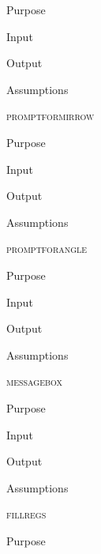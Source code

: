 \documentclass[pdftex, 11pt]{article}
\begin{document}
\begin{description}
		\begin{description}
			\item{Purpose}


			\item{Input}


			\item{Output}


			\item{Assumptions}


		\end{description}


	\item{\textsc{promptformirrow}}

		\begin{description}
			\item{Purpose}


			\item{Input}


			\item{Output}


			\item{Assumptions}


		\end{description}


	\item{\textsc{promptforangle}}

		\begin{description}
			\item{Purpose}


			\item{Input}


			\item{Output}


			\item{Assumptions}


		\end{description}


	\item{\textsc{messagebox}}
		\begin{description}
			\item{Purpose}


			\item{Input}


			\item{Output}


			\item{Assumptions}


		\end{description}



	\item{\textsc{fillregs}}
		\begin{description}
			\item{Purpose}



\end{description}
\end{description}
\end{document}
